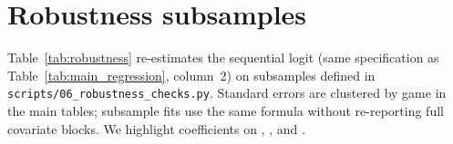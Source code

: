 \label{app:robustness}

\section{Robustness subsamples}

\label{app:robustness:detail}



Table~\ref{tab:robustness} re-estimates the sequential logit (same specification as Table~\ref{tab:main_regression}, column~2) on subsamples defined in \texttt{scripts/06\_robustness\_checks.py}. Standard errors are clustered by game in the main tables; subsample fits use the same formula without re-reporting full covariate blocks. We highlight coefficients on \fouldiff, \perioddiff, and \foullast.




